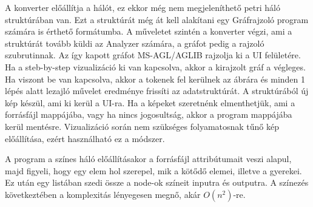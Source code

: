 A konverter előállítja a hálót, ez ekkor még nem megjeleníthető petri háló struktúrában van. Ezt a struktúrát még át kell alakítani egy Gráfrajzoló program számára is érthető formátumba. A műveletet szintén a konverter végzi, ami a struktúrát tovább küldi az Analyzer számára, a gráfot pedig a rajzoló szubrutinnak. Az így kapott gráfot MS-AGL/AGLIB rajzolja ki a UI felületére. Ha a steb-by-step vizualizáció ki van kapcsolva, akkor a kirajzolt gráf a végleges. Ha viszont be van kapcsolva, akkor a tokenek fel kerülnek az ábrára és minden 1 lépés alatt lezajló művelet eredménye frissíti az adatstruktúrát. A struktúrából új kép készül, ami ki kerül a UI-ra. Ha a képeket szeretnénk elmenthetjük, ami a forrásfájl mappájába, vagy ha nincs jogosultság, akkor a program mappájába kerül mentésre. Vizualizáció során nem szükséges folyamatosnak tűnő kép előállítása, ezért használható ez a módszer. 

A program a színes háló előállításakor a forrásfájl attribútumait veszi alapul, majd figyeli, hogy egy elem hol szerepel, mik a kötődő elemei, illetve a gyerekei. Ez után egy listában szedi össze a node-ok színeit inputra és outputra. A színezés következtében a komplexitás lényegesen megnő, akár $O(n^2)$-re.

